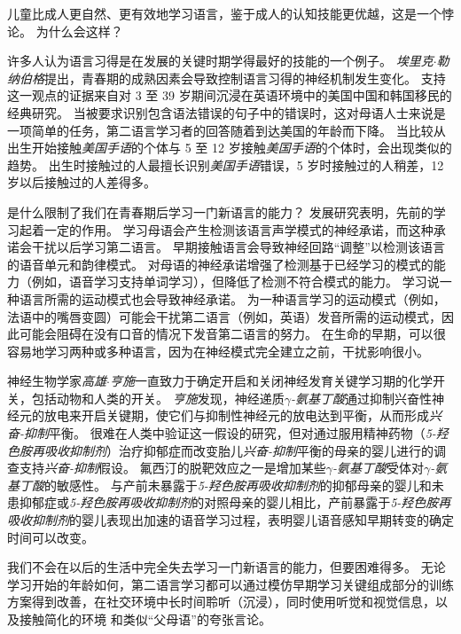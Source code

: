 儿童比成人更自然、更有效地学习语言，鉴于成人的认知技能更优越，这是一个悖论。
为什么会这样？


许多人认为语言习得是在发展的关键时期学得最好的技能的一个例子。
\textit{埃里克$\cdot$勒纳伯格}提出，青春期的成熟因素会导致控制语言习得的神经机制发生变化。
支持这一观点的证据来自对 3 至 39 岁期间沉浸在英语环境中的美国中国和韩国移民的经典研究。
当被要求识别包含语法错误的句子中的错误时，这对母语人士来说是一项简单的任务，第二语言学习者的回答随着到达美国的年龄而下降。
当比较从出生开始接触\textit{美国手语}的个体与 5 至 12 岁接触\textit{美国手语}的个体时，会出现类似的趋势。
出生时接触过的人最擅长识别\textit{美国手语}错误，5 岁时接触过的人稍差，12 岁以后接触过的人差得多。


是什么限制了我们在青春期后学习一门新语言的能力？
发展研究表明，先前的学习起着一定的作用。
学习母语会产生检测该语言声学模式的神经承诺，而这种承诺会干扰以后学习第二语言。
早期接触语言会导致神经回路“调整”以检测该语言的语音单元和韵律模式。
对母语的神经承诺增强了检测基于已经学习的模式的能力（例如，语音学习支持单词学习），但降低了检测不符合模式的能力。
学习说一种语言所需的运动模式也会导致神经承诺。
为一种语言学习的运动模式（例如，法语中的嘴唇变圆）可能会干扰第二语言（例如，英语）发音所需的运动模式，因此可能会阻碍在没有口音的情况下发音第二语言的努力。
在生命的早期，可以很容易地学习两种或多种语言，因为在神经模式完全建立之前，干扰影响很小。


神经生物学家\textit{高雄$\cdot$亨施}一直致力于确定开启和关闭神经发育关键学习期的化学开关，包括动物和人类的开关。
\textit{亨施}发现，神经递质\textit{$\gamma$-氨基丁酸}通过抑制兴奋性神经元的放电来开启关键期，使它们与抑制性神经元的放电达到平衡，从而形成\textit{兴奋-抑制}平衡。
很难在人类中验证这一假设的研究，但对通过服用精神药物（\textit{5-羟色胺再吸收抑制剂}）治疗抑郁症而改变胎儿\textit{兴奋-抑制}平衡的母亲的婴儿进行的调查支持\textit{兴奋-抑制}假设。
氟西汀的脱靶效应之一是增加某些\textit{$\gamma$-氨基丁酸}受体对\textit{$\gamma$-氨基丁酸}的敏感性。
与产前未暴露于\textit{5-羟色胺再吸收抑制剂}的抑郁母亲的婴儿和未患抑郁症或\textit{5-羟色胺再吸收抑制剂}的对照母亲的婴儿相比，产前暴露于\textit{5-羟色胺再吸收抑制剂}的婴儿表现出加速的语音学习过程，表明婴儿语音感知早期转变的确定时间可以改变。


我们不会在以后的生活中完全失去学习一门新语言的能力，但要困难得多。
无论学习开始的年龄如何，第二语言学习都可以通过模仿早期学习关键组成部分的训练方案得到改善，在社交环境中长时间聆听（沉浸），同时使用听觉和视觉信息，以及接触简化的环境 和类似“父母语”的夸张言论。



